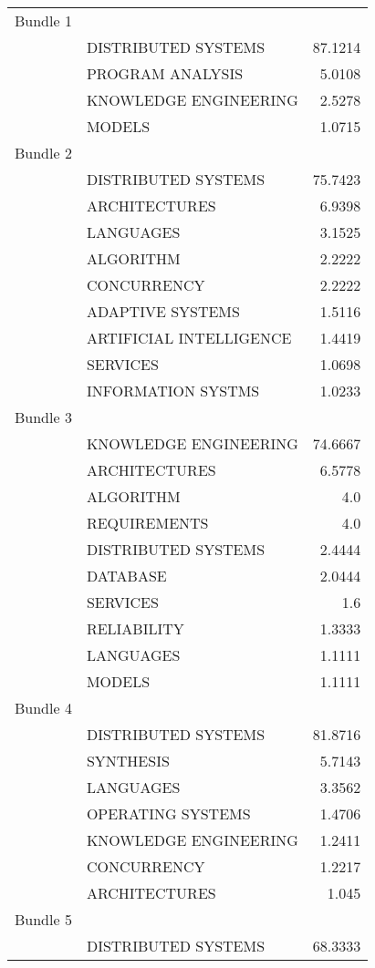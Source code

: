 \begin{center}
\begin{longtable}{|llr|}
    \hline
    Bundle 1 & ~ & ~ \\
 ~ & DISTRIBUTED SYSTEMS & 87.1214 \\
 ~ & PROGRAM ANALYSIS & 5.0108 \\
 ~ & KNOWLEDGE ENGINEERING & 2.5278 \\
 ~ & MODELS & 1.0715 \\
Bundle 2 & ~ & ~ \\
 ~ & DISTRIBUTED SYSTEMS & 75.7423 \\
 ~ & ARCHITECTURES & 6.9398 \\
 ~ & LANGUAGES & 3.1525 \\
 ~ & ALGORITHM & 2.2222 \\
 ~ & CONCURRENCY & 2.2222 \\
 ~ & ADAPTIVE SYSTEMS & 1.5116 \\
 ~ & ARTIFICIAL INTELLIGENCE & 1.4419 \\
 ~ & SERVICES & 1.0698 \\
 ~ & INFORMATION SYSTMS & 1.0233 \\
Bundle 3 & ~ & ~ \\
 ~ & KNOWLEDGE ENGINEERING & 74.6667 \\
 ~ & ARCHITECTURES & 6.5778 \\
 ~ & ALGORITHM & 4.0 \\
 ~ & REQUIREMENTS & 4.0 \\
 ~ & DISTRIBUTED SYSTEMS & 2.4444 \\
 ~ & DATABASE & 2.0444 \\
 ~ & SERVICES & 1.6 \\
 ~ & RELIABILITY & 1.3333 \\
 ~ & LANGUAGES & 1.1111 \\
 ~ & MODELS & 1.1111 \\
Bundle 4 & ~ & ~ \\
 ~ & DISTRIBUTED SYSTEMS & 81.8716 \\
 ~ & SYNTHESIS & 5.7143 \\
 ~ & LANGUAGES & 3.3562 \\
 ~ & OPERATING SYSTEMS & 1.4706 \\
 ~ & KNOWLEDGE ENGINEERING & 1.2411 \\
 ~ & CONCURRENCY & 1.2217 \\
 ~ & ARCHITECTURES & 1.045 \\
Bundle 5 & ~ & ~ \\
 ~ & DISTRIBUTED SYSTEMS & 68.3333 \\

\end{longtable}
\end{center}
